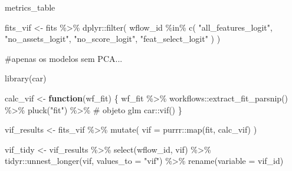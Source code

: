 \documentclass[
  letterpaper,
  DIV=11,
  numbers=noendperiod]{scrartcl}
\newenvironment{Shaded}{\begin{snugshade}}{\end{snugshade}}
\newcommand{\AttributeTok}[1]{\textcolor[rgb]{0.40,0.45,0.13}{#1}}
\newcommand{\CommentTok}[1]{\textcolor[rgb]{0.37,0.37,0.37}{#1}}
\newcommand{\ControlFlowTok}[1]{\textcolor[rgb]{0.00,0.23,0.31}{\textbf{#1}}}
\newcommand{\FunctionTok}[1]{\textcolor[rgb]{0.28,0.35,0.67}{#1}}
\newcommand{\NormalTok}[1]{\textcolor[rgb]{0.00,0.23,0.31}{#1}}
\newcommand{\OtherTok}[1]{\textcolor[rgb]{0.00,0.23,0.31}{#1}}
\newcommand{\SpecialCharTok}[1]{\textcolor[rgb]{0.37,0.37,0.37}{#1}}
\newcommand{\StringTok}[1]{\textcolor[rgb]{0.13,0.47,0.30}{#1}}
\begin{document}
\begin{Shaded}
\begin{Highlighting}[]
\NormalTok{metrics\_table}
\end{Highlighting}
\end{Shaded}

\begin{Shaded}
\begin{Highlighting}[]
\NormalTok{fits\_vif }\OtherTok{\textless{}{-}}\NormalTok{ fits }\SpecialCharTok{\%\textgreater{}\%}
\NormalTok{  dplyr}\SpecialCharTok{::}\FunctionTok{filter}\NormalTok{(}
\NormalTok{    wflow\_id }\SpecialCharTok{\%in\%} \FunctionTok{c}\NormalTok{(}
      \StringTok{"all\_features\_logit"}\NormalTok{,}
      \StringTok{"no\_assets\_logit"}\NormalTok{,}
      \StringTok{"no\_score\_logit"}\NormalTok{,}
      \StringTok{"feat\_select\_logit"}
\NormalTok{    )}
\NormalTok{  )}

\CommentTok{\#apenas os modelos sem PCA...}
\end{Highlighting}
\end{Shaded}

\begin{Shaded}
\begin{Highlighting}[]
\FunctionTok{library}\NormalTok{(car)}

\NormalTok{calc\_vif }\OtherTok{\textless{}{-}} \ControlFlowTok{function}\NormalTok{(wf\_fit) \{}
\NormalTok{  wf\_fit }\SpecialCharTok{\%\textgreater{}\%}
\NormalTok{    workflows}\SpecialCharTok{::}\FunctionTok{extract\_fit\_parsnip}\NormalTok{() }\SpecialCharTok{\%\textgreater{}\%}
    \FunctionTok{pluck}\NormalTok{(}\StringTok{"fit"}\NormalTok{) }\SpecialCharTok{\%\textgreater{}\%}      \CommentTok{\# objeto glm}
\NormalTok{    car}\SpecialCharTok{::}\FunctionTok{vif}\NormalTok{()}
\NormalTok{\}}

\NormalTok{vif\_results }\OtherTok{\textless{}{-}}\NormalTok{ fits\_vif }\SpecialCharTok{\%\textgreater{}\%}
  \FunctionTok{mutate}\NormalTok{(}
    \AttributeTok{vif =}\NormalTok{ purrr}\SpecialCharTok{::}\FunctionTok{map}\NormalTok{(fit, calc\_vif)}
\NormalTok{  )}
\end{Highlighting}
\end{Shaded}

\begin{Shaded}
\begin{Highlighting}[]
\NormalTok{vif\_tidy }\OtherTok{\textless{}{-}}\NormalTok{ vif\_results }\SpecialCharTok{\%\textgreater{}\%}
  \FunctionTok{select}\NormalTok{(wflow\_id, vif) }\SpecialCharTok{\%\textgreater{}\%}
\NormalTok{  tidyr}\SpecialCharTok{::}\FunctionTok{unnest\_longer}\NormalTok{(vif, }\AttributeTok{values\_to =} \StringTok{"vif"}\NormalTok{) }\SpecialCharTok{\%\textgreater{}\%}
  \FunctionTok{rename}\NormalTok{(}\AttributeTok{variable =}\NormalTok{ vif\_id)}
\end{Highlighting}
\end{Shaded}
\end{document}
